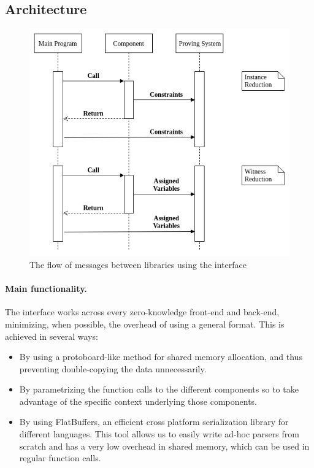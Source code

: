 \subsection{Architecture}


\begin{figure}[h!]
	\includegraphics[width=\linewidth]{call_flow.png}
	\caption{The flow of messages between libraries using the interface}
	\label{flow}
\end{figure}
		
\paragraph{Main functionality.}

The interface works across every zero-knowledge front-end and back-end, minimizing, when possible, the overhead of using a general format. This is achieved in several ways:

\begin{itemize}
	\item By using a protoboard-like method for shared memory allocation, and thus preventing double-copying the data unnecessarily.
	\item By parametrizing the function calls to the different components so to take advantage of the specific context underlying those components.
	\item By using FlatBuffers, an efficient cross platform serialization library for different languages. This tool allows us to easily write ad-hoc parsers from scratch and has a very low overhead in shared memory, which can be used in regular function calls. 
\end{itemize}


